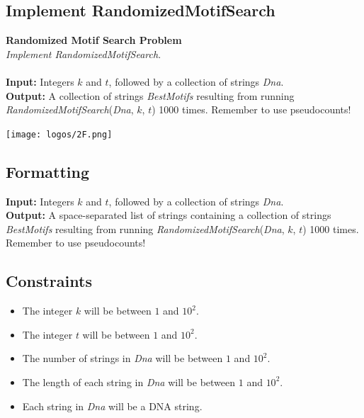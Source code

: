 \documentclass{article}
\begin{document}
\subsection{Implement RandomizedMotifSearch}
\hline\vspace{5}
\noindent\textbf{Randomized Motif Search Problem}\\
\emph{Implement RandomizedMotifSearch}.\\ \\
\textbf{Input:} Integers $k$ and $t$, followed by a collection of strings \emph{Dna}.\\
\textbf{Output:} A collection of strings \emph{BestMotifs} resulting from running \emph{RandomizedMotifSearch}(\emph{Dna}, $k$, $t$) 1000 times. Remember to use pseudocounts!
\begin{center}
    \texttt{[image: logos/2F.png]} 
\end{center}
\hline\vspace{5}

\subsection*{Formatting}
\textbf{Input:} Integers $k$ and $t$, followed by a collection of strings \emph{Dna}.\\
\noindent\textbf{Output:} A space-separated list of strings containing a collection of strings \emph{BestMotifs} resulting from running \emph{RandomizedMotifSearch}(\emph{Dna}, $k$, $t$) 1000 times. Remember to use pseudocounts!

\subsection*{Constraints}
\begin{itemize}
    \item The integer $k$ will be between $1$ and $10^2$.
    \item The integer $t$ will be between $1$ and $10^2$.
    \item The number of strings in \emph{Dna} will be between $1$ and $10^2$.
    \item The length of each string in \emph{Dna} will be between $1$ and $10^2$.
    \item Each string in \emph{Dna} will be a DNA string.
\end{itemize}
\pagebreak
\end{document}
